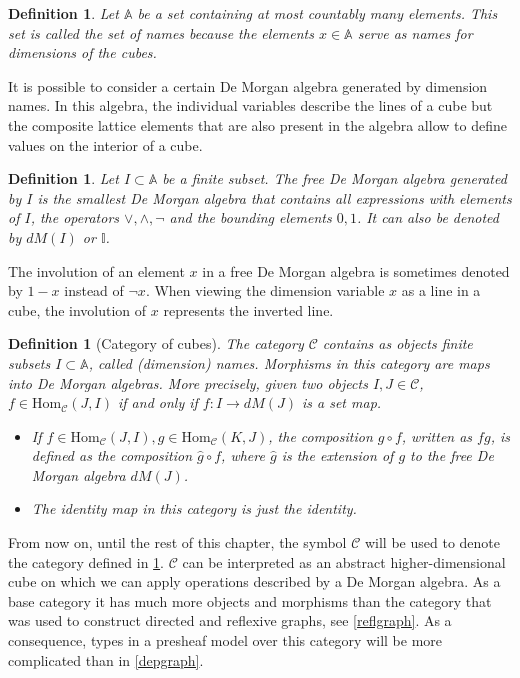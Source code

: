 \documentclass[12pt,a4paper,twoside,xetex,draft]{book}
\newcommand{\keyword}[1]{\emph{#1}\index{#1}}
\newtheorem{definition}[theorem]{Definition}
\newcommand{\homo}[3]{\text{Hom}_{#1}\left(#2,#3\right)}
\begin{document}
\begin{definition}
Let $\mathbb{A}$ be a set containing at most countably many elements. This set is called the \keyword{set of names} because the elements $x \in \mathbb{A}$ serve as names for dimensions of the cubes. 
\end{definition}

It is possible to consider a certain De Morgan algebra generated by dimension names. In this algebra, the individual variables describe the lines of a cube but the composite lattice elements that are also present in the algebra allow to define values on the interior of a cube.


\begin{definition}\label{freedm}
Let $I \subset \mathbb{A}$ be a finite subset. The \keyword{free De Morgan algebra} generated by $I$ is the smallest De Morgan algebra that contains all expressions with elements of $I$, the operators $\vee, \wedge, \neg$ and  the bounding elements $0, 1$. It can also be denoted by $dM(I)$ or $\mathbb{I}$.
\end{definition}

The involution of an element $x$ in a free De Morgan algebra is sometimes denoted by $1- x$ instead  of $\neg x$. When viewing the dimension variable $x$ as a line in a cube, the involution of $x$ represents the inverted line. 




\begin{definition}[Category of cubes]\label{cubcat}
  The category $\mathcal{C}$ contains as objects finite subsets $I \subset \mathbb{A}$, called (dimension) names. Morphisms in this category are maps into De Morgan algebras. More precisely, given two objects $I,J \in \mathcal{C}$, $f \in \text{Hom}_{\mathcal{C}}(J,I)$ if and only if $f: I \rightarrow dM(J)$ is a set map.
  \begin{itemize}
  \item  If $f \in \homo{\mathcal{C}}{J}{I}, g \in \homo{\mathcal{C}}{K}{J}$, the composition $g \circ f$, written as $fg$, is defined as the composition  $\hat{g} \circ f$, where $\hat{g}$ is the extension of $g$ to the free De Morgan algebra $dM(J)$.
    \item The identity map in this category is just the identity.
\end{itemize}
    \end{definition}

From now on, until the rest of this chapter, the symbol $\mathcal{C}$ will be used to denote the category defined in \cref{cubcat}. $\mathcal{C}$ can be interpreted as an abstract higher-dimensional cube on which we can apply operations described by a De Morgan algebra. As a base category it has much more objects and morphisms than the category that was used to construct directed and reflexive graphs, see \cref{reflgraph}. As a consequence, types in a presheaf model over this category will be more complicated than in \cref{depgraph}.
\end{document}
